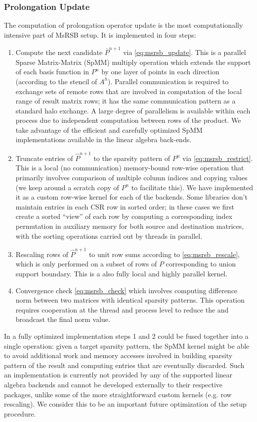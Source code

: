 \subsubsection{Prolongation Update}
\label{subsubsec:par_kernels_msrsb_update}

The computation of prolongation operator update is the most computationally intensive part of MsRSB setup.   It is implemented in four steps:
\begin{enumerate}
    \item Compute the next candidate $\bar{P}^{n+1}$ via \cref{eq:msrsb_update}.   This is a parallel Sparse Matrix-Matrix (SpMM) multiply operation which extends the support of each basis function in $P^n$ by one layer of points in each direction (according to the stencil of $A^h$).   Parallel communication is required to exchange sets of remote rows that are involved in computation of the local range of result matrix rows; it has the same communication pattern as a standard halo exchange.   A large degree of parallelism is available within each process due to independent computation between rows of the product.   We take advantage of the efficient and carefully optimized SpMM implementations available in the linear algebra back-ends.
    \item Truncate entries of $\hat{P}^{n+1}$ to the sparsity pattern of $P^n$ via \cref{eq:msrsb_restrict}.   This is a local (no communication) memory-bound row-wise operation that primarily involves comparison of multiple column indices and copying values (we keep around a scratch copy of $P^n$ to facilitate this).   We have implemented it as a custom row-wise kernel for each of the backends.   Some libraries don't maintain entries in each CSR row in sorted order; in these cases we first create a sorted ``view'' of each row by computing a corresponding index permutation in auxiliary memory for both source and destination matrices, with the sorting operations carried out by threads in parallel.
    \item Rescaling rows of $\hat{P}^{n+1}$ to unit row sums according to \cref{eq:msrsb_rescale}, which is only performed on a subset of rows of $P$ corresponding to union support boundary.   This is a also fully local and highly parallel kernel.
    \item Convergence check \cref{eq:msrsb_check} which involves computing difference norm between two matrices with identical sparsity patterns.   This operation requires cooperation at the thread and process level to reduce the and broadcast the final norm value.
\end{enumerate}
In a fully optimized implementation steps 1 and 2 could be fused together into a single operation: given a target sparsity pattern, the SpMM kernel might be able to avoid additional work and memory accesses involved in building sparsity pattern of the result and computing entries that are eventually discarded.   Such an implementation is currently not provided by any of the supported linear algebra backends and cannot be developed externally to their respective packages, unlike some of the more straightforward custom kernels (e.g. row rescaling).   We consider this to be an important future optimization of the setup procedure.

